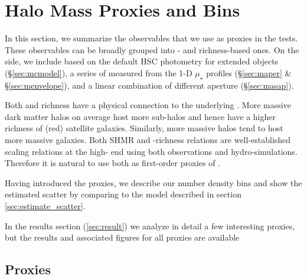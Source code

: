 \documentclass[fleqn,usenatbib,useAMS,english]{mnras}
\begin{document}
\section{Halo Mass Proxies and Bins}
    \label{sec:proxies}

    In this section, we summarize the observables that we use as \mvir{} proxies in the \topn{} tests.
    These observables can be broadly grouped into \mstar{}- and richness-based ones.
    On the \mstar{} side, we include \mstar{} based on the default HSC photometry for extended
    objects (\S \ref{sec:mcmodel}), a series of \mstar{} measured from the 1-D $\mu_{\star}$
    profiles (\S \ref{sec:maper} \& \S \ref{sec:menvelope}), and a linear combination of
    different aperture \mstar{} (\S \ref{sec:masap}).

    Both \mstar{} and richness have a physical connection to the underlying \mvir{}.
    More massive dark matter halos on average host more sub-halos and hence have a higher richness of
    (red) satellite galaxies.
    Similarly, more massive halos tend to host more massive galaxies.
    Both SHMR and \mvir{}-richness relations are well-established scaling relations at
    the high-\mvir{} end using both observations and hydro-simulations.
    Therefore it is natural to use both as first-order proxies of \mvir{}.

    Having introduced the proxies, we describe our number density bins and show the estimated
    scatter by comparing to the model described in section \ref{sec:estimate_scatter}.

    In the results section (\ref{sec:result}) we analyze in detail a few interesting proxies,
    but the results and associated figures for all proxies are available

\subsection{Proxies}
\end{document}
